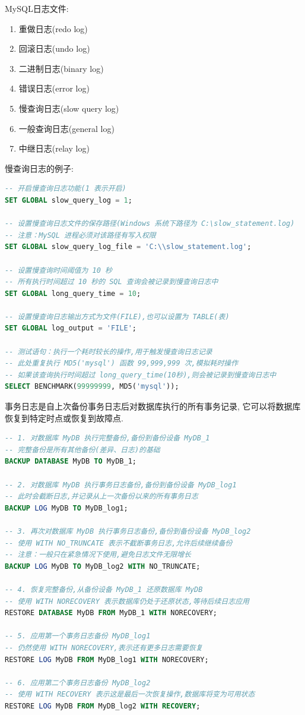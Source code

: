 MySQL日志文件:
\begin{enumerate}
    \item 重做日志(redo log)
    \item 回滚日志(undo log)
    \item 二进制日志(binary log)
    \item 错误日志(error log)
    \item 慢查询日志(slow query log)
    \item 一般查询日志(general log)
    \item 中继日志(relay log)
\end{enumerate}

慢查询日志的例子:
\begin{lstlisting}[language=sql]
-- 开启慢查询日志功能(1 表示开启)
SET GLOBAL slow_query_log = 1;

-- 设置慢查询日志文件的保存路径(Windows 系统下路径为 C:\slow_statement.log)
-- 注意：MySQL 进程必须对该路径有写入权限
SET GLOBAL slow_query_log_file = 'C:\\slow_statement.log';

-- 设置慢查询时间阈值为 10 秒
-- 所有执行时间超过 10 秒的 SQL 查询会被记录到慢查询日志中
SET GLOBAL long_query_time = 10;

-- 设置慢查询日志输出方式为文件(FILE),也可以设置为 TABLE(表)
SET GLOBAL log_output = 'FILE';

-- 测试语句：执行一个耗时较长的操作,用于触发慢查询日志记录
-- 此处重复执行 MD5('mysql') 函数 99,999,999 次,模拟耗时操作
-- 如果该查询执行时间超过 long_query_time(10秒),则会被记录到慢查询日志中
SELECT BENCHMARK(99999999, MD5('mysql'));
\end{lstlisting}

事务日志是自上次备份事务日志后对数据库执行的所有事务记录, 它可以将数据库恢复到特定时点或恢复到故障点.
\begin{lstlisting}[language=sql]
-- 1. 对数据库 MyDB 执行完整备份,备份到备份设备 MyDB_1
-- 完整备份是所有其他备份(差异、日志)的基础
BACKUP DATABASE MyDB TO MyDB_1;

-- 2. 对数据库 MyDB 执行事务日志备份,备份到备份设备 MyDB_log1
-- 此时会截断日志,并记录从上一次备份以来的所有事务日志
BACKUP LOG MyDB TO MyDB_log1;

-- 3. 再次对数据库 MyDB 执行事务日志备份,备份到备份设备 MyDB_log2
-- 使用 WITH NO_TRUNCATE 表示不截断事务日志,允许后续继续备份
-- 注意：一般只在紧急情况下使用,避免日志文件无限增长
BACKUP LOG MyDB TO MyDB_log2 WITH NO_TRUNCATE;

-- 4. 恢复完整备份,从备份设备 MyDB_1 还原数据库 MyDB
-- 使用 WITH NORECOVERY 表示数据库仍处于还原状态,等待后续日志应用
RESTORE DATABASE MyDB FROM MyDB_1 WITH NORECOVERY;

-- 5. 应用第一个事务日志备份 MyDB_log1
-- 仍然使用 WITH NORECOVERY,表示还有更多日志需要恢复
RESTORE LOG MyDB FROM MyDB_log1 WITH NORECOVERY;

-- 6. 应用第二个事务日志备份 MyDB_log2
-- 使用 WITH RECOVERY 表示这是最后一次恢复操作,数据库将变为可用状态
RESTORE LOG MyDB FROM MyDB_log2 WITH RECOVERY;
\end{lstlisting}

